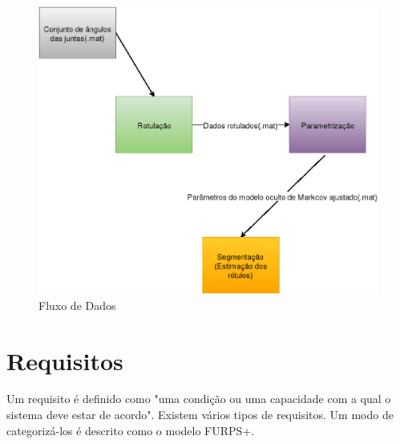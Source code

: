   \begin{figure}[H]
  \centering
  \includegraphics [keepaspectratio=true,scale=0.60]{figuras/diagramProt.eps}
  \caption{Fluxo de Dados}
  \label{diagramProt}

  \end{figure}


  \section {Requisitos}
  \label{Sec:Requisitos}
    Um requisito é definido como "uma condição ou uma capacidade com a qual o
  sistema deve estar de acordo"\cite{requisitos}. Existem vários tipos de
  requisitos. Um modo de categorizá-los é descrito como o modelo
  FURPS+\cite{robertGrady}.

